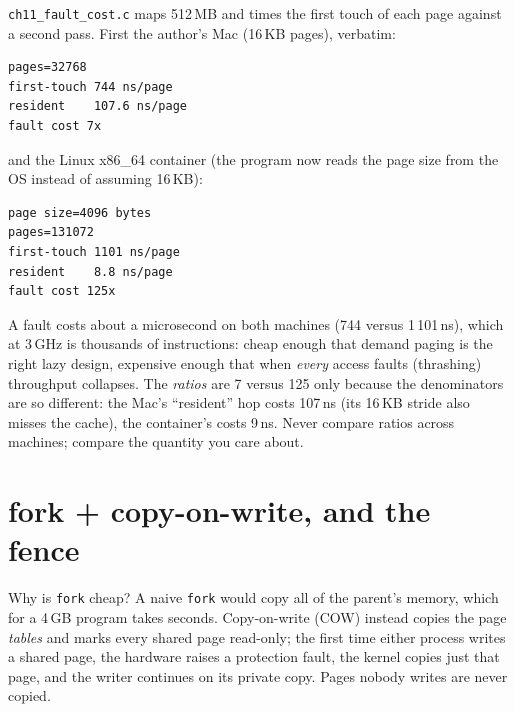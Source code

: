 \begin{example}
\texttt{ch11\_fault\_cost.c} maps 512\,MB and times the first touch of
each page against a second pass. First the author's Mac (16\,KB pages),
verbatim:

\begin{verbatim}
pages=32768
first-touch 744 ns/page
resident    107.6 ns/page
fault cost 7x
\end{verbatim}
\noindent and the Linux x86\_64 container (the program now reads the page
size from the OS instead of assuming 16\,KB):

\begin{lstlisting}[language={},caption={Linux x86\_64 container, \texttt{./ch11\_fault\_cost}, one run (three runs gave 1\,001--1\,197\,ns first touch, 7--9\,ns resident, 125--159$\times$). Captured in \texttt{code/ch11\_fault\_cost\_linux.txt}.}]
page size=4096 bytes
pages=131072
first-touch 1101 ns/page
resident    8.8 ns/page
fault cost 125x
\end{lstlisting}

A fault costs about a microsecond on both machines (744 versus
1\,101\,ns), which at 3\,GHz is thousands of instructions: cheap enough
that demand paging is the right lazy design, expensive enough that when
\emph{every} access faults (thrashing) throughput collapses. The
\emph{ratios} are 7 versus 125 only because the denominators are so
different: the Mac's ``resident'' hop costs 107\,ns (its 16\,KB stride
also misses the cache), the container's costs 9\,ns. Never compare
ratios across machines; compare the quantity you care about.
\end{example}



\section{fork + copy-on-write, and the fence}
\label{sec:cow11}

Why is \texttt{fork} cheap? A naive \texttt{fork} would copy all of the
parent's memory, which for a 4\,GB program takes seconds. Copy-on-write
(COW) instead copies the page \emph{tables} and marks every shared page
read-only; the first time either process writes a shared page, the
hardware raises a protection fault, the kernel copies just that page,
and the writer continues on its private copy. Pages nobody writes are
never copied.

